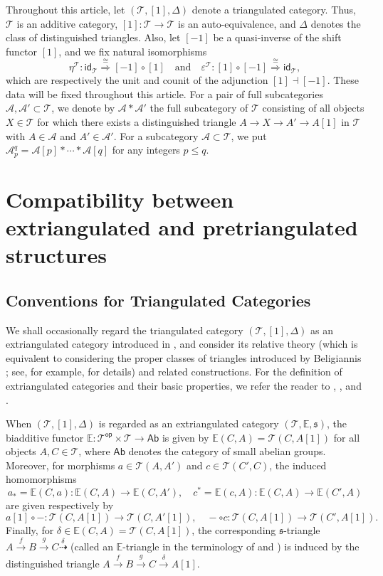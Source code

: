 \documentclass[a4paper,reqno,10pt]{amsart}
\theoremstyle{definition}
\theoremstyle{definition}
\theoremstyle{definition}
\theoremstyle{definition}
\theoremstyle{plain}
\def\Ab{\mathsf{Ab}}
\newcommand{\op}{\mathsf{op}}
\newcommand{\id}{\mathsf{id}}
\newcommand{\fs}{\mathfrak{s}}
\newcommand{\BE}{\mathbb{E}}
\newcommand{\CA}{\mathcal{A}}
\newcommand{\CT}{\mathcal{T}}
\begin{document}
\color{blue}
Throughout this article, let $(\CT,[1],\Delta)$ denote a triangulated category. Thus, $\CT$ is an additive category, $[1]\colon\CT\to\CT$ is an auto-equivalence, and $\Delta$ denotes the class of distinguished triangles. Also, let $[-1]$ be a quasi-inverse of the shift functor $[1]$, and we fix natural isomorphisms
\[
\eta^{\CT}\colon \id_{\CT}\overset{\cong}{\Longrightarrow}[-1]\circ [1]
\quad\text{and}\quad
\varepsilon^{\CT}\colon [1]\circ [-1]\overset{\cong}{\Longrightarrow}\id_{\CT},
\]
which are respectively the unit and counit of the adjunction $[1]\dashv[-1]$.
These data will be fixed throughout this 
\color{blue}
article. 
\normalcolor
For a pair of full subcategories $\CA,\CA'\subset\CT$, we denote by $\CA\ast\CA'$ the full subcategory of $\CT$ consisting of all objects $X\in\CT$ for which there exists a distinguished triangle $A\to X\to A'\to A[1]$ in $\CT$ with $A\in\CA$ and $A'\in\CA'$.
For a subcategory $\CA\subset\CT$, we put $\CA_{p}^{q}=\CA[p]*\cdots *\CA[q]$ for any integers $p\leq q$.


\normalcolor

\section{Compatibility between extriangulated and pretriangulated structures}
\label{section:compatibility}

\subsection{Conventions for Triangulated Categories}


\color{blue}

We shall occasionally regard the triangulated category
$(\CT,[1],\Delta)$ as an extriangulated category introduced in
\cite{NP19}, and consider its relative theory (which is equivalent to
considering the proper classes of triangles introduced by Beligiannis
\cite{Bel20}; see, for example, \cite[Appendix~A]{Sak23} for details) and related constructions.
For the definition of extriangulated categories and their basic properties,
we refer the reader to \cite{NP19}, \cite{LN19}, and \cite{INP24}.

When $(\CT,[1],\Delta)$ is regarded as an extriangulated category $(\CT,\BE,\fs)$, the biadditive functor
$\BE\colon\CT^{\op}\times\CT\to\Ab$
is given by
$\BE(C,A)=\CT(C,A[1])$
for all objects $A,C\in\CT$, where $\Ab$ denotes the category of small
abelian groups.
Moreover, for morphisms $a\in\CT(A,A')$ and
$c\in\CT(C',C)$, the induced homomorphisms
\[ a_{\ast}=\BE(C,a)\colon\BE(C,A)\to\BE(C,A'),
\quad
c^{\ast}=\BE(c,A)\colon\BE(C,A)\to\BE(C',A) \]
are given respectively by
\[ a[1]\circ-\colon\CT(C,A[1])\to\CT(C,A'[1]),
\quad
-\circ c\colon\CT(C,A[1])\to\CT(C',A[1]). \]
Finally, for $\delta\in\BE(C,A)=\CT(C,A[1])$, the corresponding
$\fs$-triangle
$A\xrightarrow{f}B\xrightarrow{g}C\overset{\delta}{\dashrightarrow}$
(called an $\BE$-triangle in the terminology of \cite{NP19} and
\cite{LN19}) is induced by the distinguished triangle
$A\xrightarrow{f}B\xrightarrow{g}C\xrightarrow{\delta}A[1]$.
\end{document}
